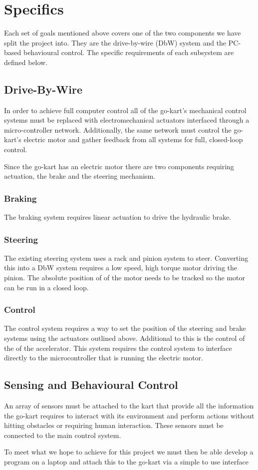 \section{Specifics}
Each set of goals mentioned above covers one of the two components we have split the project into. They are the drive-by-wire (DbW) system and the PC-based behavioural control. The specific requirements of each subsystem are defined below.

\subsection{Drive-By-Wire}
In order to achieve full computer control all of the go-kart's mechanical control systems must be replaced with electromechanical actuators interfaced through a micro-controller network. Additionally, the same network must control the go-kart's electric motor and gather feedback from all systems for full, closed-loop control.

Since the go-kart has an electric motor there are two components requiring actuation, the brake and the steering mechanism.

\subsubsection{Braking}
The braking system requires linear actuation to drive the hydraulic  brake. 

\subsubsection{Steering}
The existing steering system uses a rack and pinion system to steer. Converting this into a DbW system requires a low speed, high torque motor driving the pinion. The absolute position of of the motor needs to be tracked so the motor can be run in a closed loop.

\subsubsection{Control}
The control system requires a way to set the position of the steering and brake systems using the actuators outlined above. Additional to this is the control of the of the accelerator. This system requires the control system to interface directly to the microcontroller that is running the electric motor.

\subsection{Sensing and Behavioural Control}
An array of sensors must be attached to the kart that provide all the information the go-kart requires to interact with its environment and perform actions without hitting obstacles or requiring human interaction. These sensors must be connected to the main control system. 

To meet what we hope to achieve for this project we must then be able develop a program on a laptop and attach this to the go-kart via a simple to use interface

